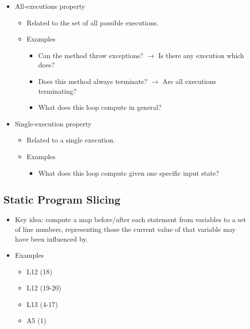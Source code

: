 \documentclass{article}
\begin{document}
\begin{itemize}
    \item All-executions property
    \begin{itemize}
        \item Related to the set of all possible executions.
        \item Examples
        \begin{itemize}
            \item Can the method throw exceptions? $\rightarrow$ Is there any execution which does?
            \item Does this method always terminate? $\rightarrow$ Are all executions terminating?
            \item What does this loop compute in general?
        \end{itemize}
    \end{itemize}
    \item Single-execution property
    \begin{itemize}
        \item Related to a single execution.
        \item Examples
        \begin{itemize}
            \item What does this loop compute given one specific input state?
        \end{itemize}
    \end{itemize}
\end{itemize}

\subsection{Static Program Slicing}

\begin{itemize}
    \item Key idea: compute a map before/after each statement from variables to a set of line numbers, representing those the current value of that variable may have been influenced by.
    \item Examples
    \begin{itemize}
        \item L12 (18)
        \item L12 (19-20)
        \item L13 (4-17)
        \item A5 (1)
    \end{itemize}
\end{itemize}
\end{document}
